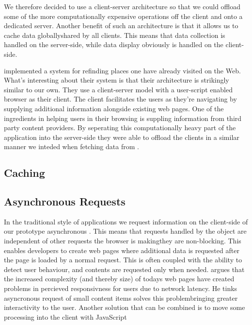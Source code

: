 We therefore decided to use a client-server architecture so that we could
offload some of the more computationally expensive operations off the client
and onto a dedicated server. Another benefit of such an architecture is that
it allows us to cache data globally\dash{}shared by all clients. This means
that data collection is handled on the server-side, while data display
obviously is handled on the client-side.

\citet[--888]{nishimoto06} implemented a system for refinding places one
have already visited on the Web. What's interesting about their system is that
their architecture is strikingly similar to our own. They use a
client-server model with a user-script enabled browser as their client. The
client facilitates the users as they're navigating by supplying additional
information alongside existing web pages. One of the ingredients in helping
users in their browsing is suppling information from third party content
providers. By seperating this computationally heavy part of the application
into the server-side they were able to offload the clients in a similar
manner we inteded when fetching data from \urort{}.

\subsection{Caching}

\subsection{Asynchronous Requests}

In the traditional style of  applications we request information on
the client-side of our prototype asynchronous%
.
This means that requests handled by the  object
are independent of other requests the browser is making\dash{}they
are non-blocking. This enables developers to create web pages where additional
data is requested after the page is loaded by a normal  request.
This is often coupled with the ability to detect user behaviour, and contents
are requested only when needed. \citet[pp.281--282]{stamey06} argues that
the increased complexity (and thereby size) of todays web pages have created
problems in percieved responsivness for users due to network latency. He
tinks asyncronous request of small content items solves this
problem\dash{}bringing greater interactivity to the user. Another solution
that can be combined is to move some processing into the client with
JavaScript \citep[]{jazayeri07}

